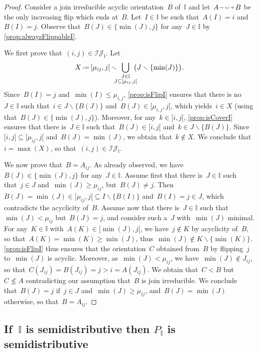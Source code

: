 \documentclass{amsart}
\theoremstyle{definition}
\newcommand{\cal}[1]{\mathcal{#1}} %
\newcommand{\ssm}{\smallsetminus} %
\newcommand{\eqdef}{\mbox{\,\raisebox{0.2ex}{\scriptsize\ensuremath{\mathrm:}}\ensuremath{=}\,}} %
\newcommand{\II}{\mathbb I} %
\newcommand{\cIJ}{\cal{IJ}} %
\newcommand{\flip}[4]{\ensuremath{#1 \, \begin{tikzpicture}[scale=1,baseline=-.1cm] \path[->]  (0,0) edge node[fill=white,inner sep=2pt, font=\tiny ] {$#2#3$} (.7,0); \end{tikzpicture} \, #4}}
\begin{document}
\begin{proof}
\enlargethispage{.4cm}
Consider a join irreducible acyclic orientation~$B$ of~$\II$ and let~$\flip{A}{i}{j}{B}$ be the only increasing flip which ends at~$B$.
Let~$I \in \II$ be such that~$A(I) = i$ and~$B(I) = j$.
Observe that~$B(J) \in \{\min(J), j\}$ for any~$J \in \II$ by \cref{prop:alwaysFlippableI}.

We first prove that~$(i,j) \in \cIJ_\II$.
Let
\[
X \eqdef {[\mu_{ij},j[} \ssm \!\!\!\! \bigcup_{\substack{J \in \II \\ J \subseteq {[\mu_{ij}, j[}}} \!\!\!\! \big( J \ssm \{\min(J)\} \big).
\]
Since~$B(I) = j$ and~$\min(I) \le \mu_{i,j}$, \cref{prop:isFlipI} ensures that there is no~$J \in \II$ such that~${i \in J \ssm \{B(J)\}}$ and~$B(J) \in {[\mu_{i,j}, j[}$, which yields~$i \in X$ (using that~$B(J) \in \{\min(J),j\}$).
Moreover, for any~$k \in {]i,j[}$, \cref{prop:isCoverI} ensures that there is~$J \in \II$ such that~$B(J) \in {[i,j[}$ and~$k \in J \ssm \{B(J)\}$.
Since~${[i,j[} \subseteq {[\mu_{ij},j[}$ and~$B(J) = \min(J)$, we obtain that~$k \notin X$.
We conclude that~$i = \max(X)$, so that~$(i,j) \in \cIJ_\II$.

We now prove that~$B = A_{ij}$.
As already observed, we have~$B(J) \in \{\min(J), j\}$ for any~${J \in \II}$.
Assume first that there is~$J \in \II$ such that~$j \in J$ and~$\min(J) \ge \mu_{ij}$, but~$B(J) \ne j$.
Then ${B(J) = \min(J) \in {[\mu_{ij}, j[} \subseteq I \ssm \{B(I)\}}$ and~$B(I) = j \in J$, which contradicts the acyclicity of~$B$.
Assume now that there is~$J \in \II$ such that~$\min(J) < \mu_{ij}$ but~${B(J) = j}$, and consider such a~$J$ with~$\min(J)$ minimal.
For any~$K \in \II$ with~$A(K) \in {[\min(J),j[}$, we have~$j \notin K$ by acyclicity of~$B$, so that~${A(K) = \min(K) \ge \min(J)}$, thus~${\min(J) \notin K \ssm \{\min(K)\}}$.
\cref{prop:isFlipI} thus ensures that the orientation~$C$ obtained from~$B$ by flipping~$j$ to~$\min(J)$ is acyclic.
Moreover, as~$\min(J) < \mu_{ij}$, we have~$\min(J) \notin J_{ij}$, so that~$C(J_{ij}) = B(J_{ij}) = j > i = A(J_{ij})$.
We obtain that~$C < B$ but~$C \not\le A$ contradicting our assumption that~$B$ is join irreducible.
We conclude that~$B(J) = j$ if~$j \in J$ and~$\min(J) \ge \mu_{ij}$, and~$B(J) = \min(J)$ otherwise, so that~$B = A_{ij}$.
\end{proof}


\subsection{If~$\II$ is semidistributive then $P_\II$ is semidistributive}
\label{subsec:semidistributiveLatticeBackward}
\end{document}
